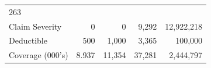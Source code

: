 \documentclass[]{book}
\begin{document}
\begin{longtable}[]{@{}lrrrr@{}}
\begin{minipage}[t]{0.14\columnwidth}
263\strut
\end{minipage}\tabularnewline
\begin{minipage}[t]{0.23\columnwidth}\raggedright\strut
Claim Severity\strut
\end{minipage} & \begin{minipage}[t]{0.12\columnwidth}\raggedleft\strut
0\strut
\end{minipage} & \begin{minipage}[t]{0.11\columnwidth}\raggedleft\strut
0\strut
\end{minipage} & \begin{minipage}[t]{0.12\columnwidth}\raggedleft\strut
9,292\strut
\end{minipage} & \begin{minipage}[t]{0.14\columnwidth}\raggedleft\strut
12,922,218\strut
\end{minipage}\tabularnewline
\begin{minipage}[t]{0.23\columnwidth}\raggedright\strut
Deductible\strut
\end{minipage} & \begin{minipage}[t]{0.12\columnwidth}\raggedleft\strut
500\strut
\end{minipage} & \begin{minipage}[t]{0.11\columnwidth}\raggedleft\strut
1,000\strut
\end{minipage} & \begin{minipage}[t]{0.12\columnwidth}\raggedleft\strut
3,365\strut
\end{minipage} & \begin{minipage}[t]{0.14\columnwidth}\raggedleft\strut
100,000\strut
\end{minipage}\tabularnewline
\begin{minipage}[t]{0.23\columnwidth}\raggedright\strut
Coverage (000's)\strut
\end{minipage} & \begin{minipage}[t]{0.12\columnwidth}\raggedleft\strut
8.937\strut
\end{minipage} & \begin{minipage}[t]{0.11\columnwidth}\raggedleft\strut
11,354\strut
\end{minipage} & \begin{minipage}[t]{0.12\columnwidth}\raggedleft\strut
37,281\strut
\end{minipage} & \begin{minipage}[t]{0.14\columnwidth}\raggedleft\strut
2,444,797\strut
\end{minipage}\tabularnewline
\bottomrule
\end{longtable}
\end{document}
